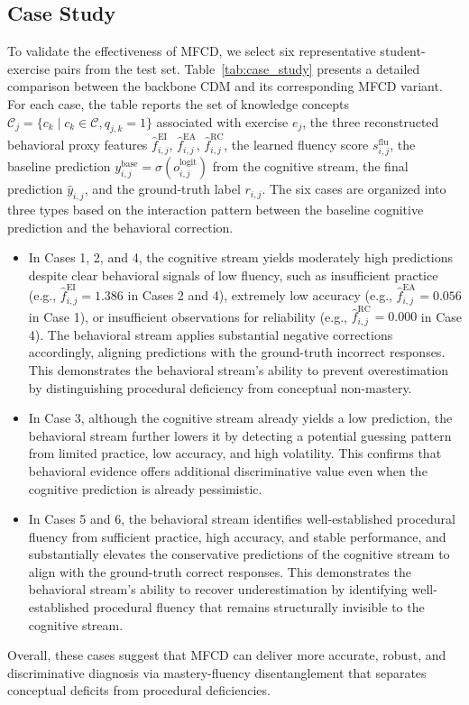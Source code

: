 \documentclass[a4paper,runningheads]{llncs}
\def\mymethod{MFCD}
\begin{document}
\subsection{Case Study}
To validate the effectiveness of \mymethod, we select six representative student-exercise pairs from the test set. Table~\ref{tab:case_study} presents a detailed comparison between the backbone CDM and its corresponding MFCD variant. For each case, the table reports the set of knowledge concepts \(\mathcal{C}_j=\{c_k \mid c_k \in \mathcal{C}, q_{j,k}=1\}\) associated with exercise \(e_j\), the three reconstructed behavioral proxy features \(\hat{f}_{i,j}^{\mathrm{EI}}\), \(\hat{f}_{i,j}^{\mathrm{EA}}\), \(\hat{f}_{i,j}^{\mathrm{RC}}\), the learned fluency score \(s_{i,j}^{\mathrm{flu}}\), the baseline prediction \(y^{\mathrm{base}}_{i,j}=\sigma(o_{i,j}^{\text{logit}})\) from the cognitive stream, the final prediction \(\hat{y}_{i,j}\), and the ground-truth label \(r_{i,j}\). The six cases are organized into three types based on the interaction pattern between the baseline cognitive prediction and the behavioral correction.
\begin{itemize}
\item In Cases 1, 2, and 4, the cognitive stream yields moderately high predictions despite clear behavioral signals of low fluency, such as insufficient practice (e.g., \(\hat{f}_{i,j}^{\mathrm{EI}}=1.386\) in Cases 2 and 4), extremely low accuracy (e.g., \(\hat{f}_{i,j}^{\mathrm{EA}}=0.056\) in Case 1), or insufficient observations for reliability (e.g., \(\hat{f}_{i,j}^{\mathrm{RC}}=0.000\) in Case 4). The behavioral stream applies substantial negative corrections accordingly, aligning predictions with the ground-truth incorrect responses.
This demonstrates the behavioral stream's ability to prevent overestimation by distinguishing procedural deficiency from conceptual non-mastery.
\item In Case 3, although the cognitive stream already yields a low prediction, the behavioral stream further lowers it by detecting a potential guessing pattern from limited practice, low accuracy, and high volatility.
This confirms that behavioral evidence offers additional discriminative value even when the cognitive prediction is already pessimistic.
\item In Cases 5 and 6, the behavioral stream identifies well-established procedural fluency from sufficient practice, high accuracy, and stable performance, and substantially elevates the conservative predictions of the cognitive stream to align with the ground-truth correct responses. This demonstrates the behavioral stream's ability to recover underestimation by identifying well-established procedural fluency that remains structurally invisible to the cognitive stream.
\end{itemize}
Overall, these cases suggest that MFCD can deliver more accurate, robust, and discriminative diagnosis via mastery-fluency disentanglement that separates conceptual deficits from procedural deficiencies.
\end{document}
